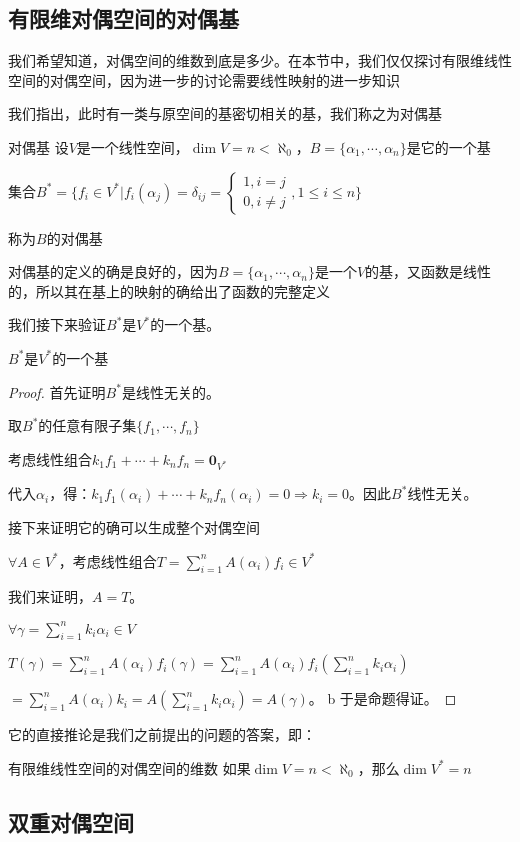 \documentclass[12pt, a4paper, oneside, UTF8]{ctexbook}
\begin{document}
		\subsection{有限维对偶空间的对偶基}
			我们希望知道，对偶空间的维数到底是多少。在本节中，我们仅仅探讨有限维线性空间的对偶空间，因为进一步的讨论需要线性映射的进一步知识

			我们指出，此时有一类与原空间的基密切相关的基，我们称之为对偶基
			\begin{defn}{对偶基}{}
				设$V$是一个线性空间，$\dim V= n < \aleph_0$，$B=\{\alpha_1,\cdots,\alpha_n\}$是它的一个基

				集合$B^*=\{f_i \in V^*| f_i(\alpha_j) = \delta _{ij} = \begin{cases}
					1, i=j \\
					0, i \neq j
				\end{cases},1 \leqslant i \leqslant n\}$

				称为$B$的对偶基
			\end{defn}
			
			对偶基的定义的确是良好的，因为$B=\{\alpha_1,\cdots,\alpha_n\}$是一个$V$的基，又函数是线性的，所以其在基上的映射的确给出了函数的完整定义

			我们接下来验证$B^*$是$V^*$的一个基。
			\begin{proposition}
				$B^*$是$V^*$的一个基
			\end{proposition}
			\begin{proof}
				首先证明$B^*$是线性无关的。

				取$B^*$的任意有限子集$\{f_1,\cdots,f_n\}$

				考虑线性组合$k_1 f_1 + \cdots+k_n f_n = \mathbf{0}_{V^*}$

				代入$\alpha_i$，得：$k_1 f_1(\alpha_i) + \cdots+k_n f_n(\alpha_i) = 0 \Rightarrow k_i = 0$。因此$B^*$线性无关。

				接下来证明它的确可以生成整个对偶空间

				$\forall A \in V^*$，考虑线性组合$T = \sum\limits_{i=1}^{n} A(\alpha_i) f_i \in V^*$

				我们来证明，$A=T$。

				$\forall \gamma = \sum\limits_{i=1}^{n} k_i \alpha_i \in V$

				$T(\gamma ) = \sum\limits_{i=1}^{n} A(\alpha_i) f_i(\gamma )=\sum\limits_{i=1}^{n} A(\alpha_i) f_i(\sum\limits_{i=1}^{n} k_i \alpha_i)$

				$= \sum\limits_{i=1}^{n} A(\alpha_i) k_i= A(\sum\limits_{i=1}^{n} k_i \alpha_i)=A(\gamma )$。
b    
				于是命题得证。
			\end{proof}
			它的直接推论是我们之前提出的问题的答案，即：
			\begin{corollary}{有限维线性空间的对偶空间的维数}{}
				如果$\dim V = n < \aleph_0$，那么$\dim V^* = n$
			\end{corollary}
		\subsection{双重对偶空间}
\ifx\allfiles\undefined
\end{document}
